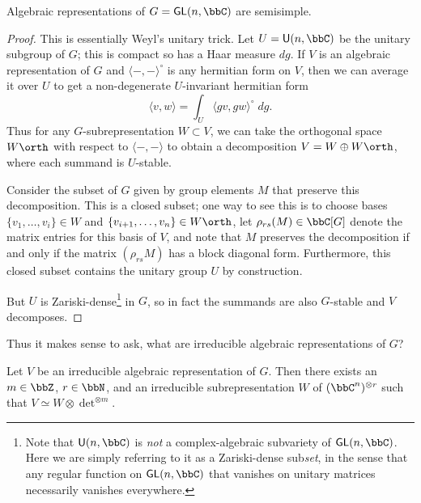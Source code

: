 \begin{theorem}
    Algebraic representations of $G=\mathsf{GL}(n,\bbC)$ are semisimple.
    \begin{proof}
        This is essentially Weyl's unitary trick. Let $U=\mathsf{U}(n,\bbC)$ be
        the unitary subgroup of $G$; this is compact so has a Haar measure $dg$.
        If $V$ is an algebraic representation of $G$ and $\langle -,-
        \rangle^\circ$ is any hermitian form on $V$, then we can average it over
        $U$ to get a non-degenerate $U$-invariant hermitian form \[\langle
        v,w\rangle = \int_{U}\langle gv,gw\rangle^\circ \; dg.\]
        Thus for any $G$-subrepresentation $W\subset V$, we can take the
        orthogonal space $W\orth$ with respect to $\langle-,-\rangle$ to obtain
        a decomposition $V=W\oplus W\orth$, where each summand is
        $U$-stable. 

        Consider the subset of $G$ given by group elements $M$ that preserve
        this decomposition. This is a closed subset; one way to see this is to
        choose bases $\{v_1,\ldots,v_i\}\in W$ and $\{v_{i+1},\ldots,v_n\}\in
        W\orth$, let $\rho_{rs}(M)\in \bbC[G]$ denote the matrix entries for this basis of $V$, and note that $M$ preserves the decomposition if and only if
        the matrix $(\rho_{rs}M)$ has a block diagonal form. Furthermore, this
        closed subset contains the unitary group $U$ by construction. 


        But $U$ is Zariski-dense\footnote{
            Note that $\mathsf{U}(n,\bbC)$ is \emph{not} a complex-algebraic subvariety of $\mathsf{GL}(n,\bbC)$. Here we are simply referring to it as a Zariski-dense sub\emph{set}, in the sense that any regular function on $\mathsf{GL}(n,\bbC)$ that vanishes on unitary matrices necessarily vanishes everywhere.
        } in $G$, so in fact the summands are also $G$-stable and $V$ decomposes. 
    \end{proof}
\end{theorem}

Thus it makes sense to ask, what are irreducible algebraic representations of
$G$?

\begin{lemma}
    Let $V$ be an irreducible algebraic representation of $G$. Then there exists
    an $m\in \bbZ$, $r\in \bbN$, and an irreducible subrepresentation $W$ of
    $(\bbC^n)^{\otimes r}$ such that $V\simeq W\otimes \det^{\otimes m}$.
\end{lemma}



